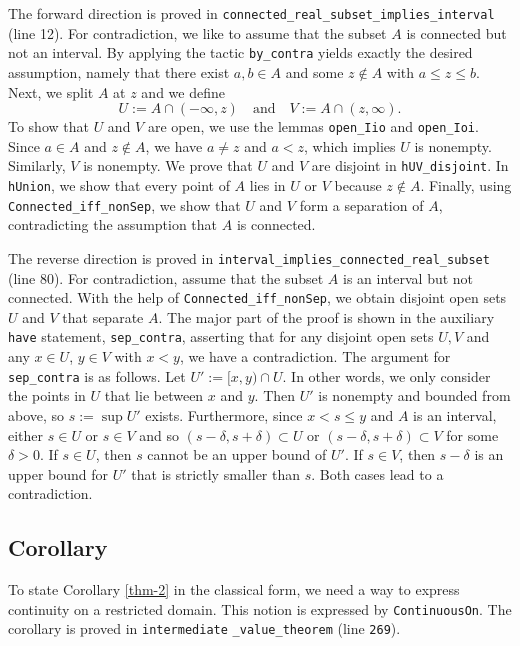 \documentclass[11pt, oneside]{article}
\theoremstyle{plain}
\theoremstyle{definition}
\begin{document}
The forward direction is proved in \verb|connected_real_subset_implies_interval| (line 12). For contradiction, we like to assume that the subset $A$ is connected but not an interval. By applying the tactic \verb|by_contra| yields exactly the desired assumption, namely that there exist $a,b \in A$ and some $z \notin A$ with $a \le z \le b$.
Next, we split $A$ at $z$ and we define
\[
U := A \cap (-\infty, z) \quad \text{and} \quad V := A \cap (z, \infty).
\]
To show that $U$ and $V$ are open, we use the lemmas \verb|open_Iio| and \verb|open_Ioi|. Since $a \in A$ and $z \notin A$, we have $a \neq z$ and $a < z$, which implies $U$ is nonempty. Similarly, $V$ is nonempty. 
We prove that $U$ and $V$ are disjoint in \verb|hUV_disjoint|.
In \verb|hUnion|, we show that every point of $A$ lies in $U$ or $V$ because $z \notin A$.
Finally, using \verb|Connected_iff_nonSep|, we show that $U$ and $V$ form a separation of $A$, contradicting the assumption that $A$ is connected.


The reverse direction is proved in \verb|interval_implies_connected_real_subset| (line 80). For contradiction, assume that the subset $A$ is an interval but not connected. With the help of \verb|Connected_iff_nonSep|, we obtain disjoint open sets $U$ and $V$ that separate $A$.
The major part of the proof is shown in the auxiliary \verb|have| statement, \verb|sep_contra|, asserting that for any disjoint open sets $U,V$ and any $x \in U$, $y \in V$ with $x < y$, we have a contradiction.
The argument for \verb|sep_contra| is as follows. Let $U' := [x,y) \cap U.$ In other words, we only consider the points in $U$ that lie between $x$ and $y$.
Then $U'$ is nonempty and bounded from above, so $s := \sup U'$ exists. Furthermore, since $x < s \le y$ and $A$ is an interval, either $s \in U$ or $s \in V$ and so $(s - \delta, s + \delta) \subset U$ or $(s - \delta, s + \delta) \subset V$ for some $\delta > 0$.
If $s \in U$, then $s$ cannot be an upper bound of $U'$. If $s \in V$, then $s-\delta$ is an upper bound for $U'$ that is strictly smaller than $s$. Both cases lead to a contradiction.


\subsection{Corollary}
To state Corollary \ref{thm-2} in the classical form, we need a way to express continuity on a restricted domain. This notion is expressed by \verb|ContinuousOn|. The corollary is proved in \verb|intermediate| \verb|_value_theorem| (line \verb|269|).
\end{document}
